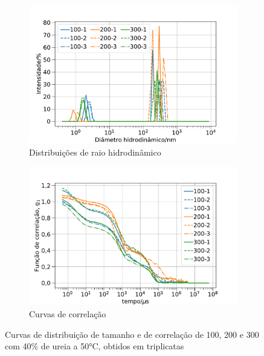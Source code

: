 \begin{figure}[h]
	\begin{subfigure}{0.50\textwidth}
		\centering
		\includegraphics[width=\textwidth]{imagens/dls/ttab_distrib}
		\caption{Distribuições de raio hidrodinâmico}
		\label{fig:DLS_ttab_distrib}
	\end{subfigure} %
	\begin{subfigure}{0.50\textwidth}
		\centering
		\includegraphics[width=\textwidth]{imagens/dls/ttab_CC}
		\caption{Curvas de correlação}
		\label{fig:DLS_ttab_cc}
	\end{subfigure}
	\caption{Curvas de distribuição de tamanho e de correlação de \TTAB{} 100, 200 e 300 \mM{} com 40\% de ureia a 50°C, obtidos em triplicatas}
	\label{fig:DLS_ttab}
\end{figure}


